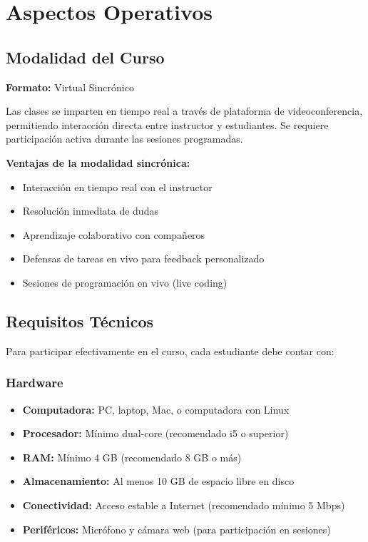 \documentclass[12pt,letterpaper]{article}
\begin{document}
\newpage

\section{Aspectos Operativos}

\subsection{Modalidad del Curso}

\textbf{Formato:} Virtual Sincrónico

Las clases se imparten en tiempo real a través de plataforma de videoconferencia, permitiendo interacción directa entre instructor y estudiantes. Se requiere participación activa durante las sesiones programadas.

\textbf{Ventajas de la modalidad sincrónica:}
\begin{itemize}[leftmargin=*]
    \item Interacción en tiempo real con el instructor
    \item Resolución inmediata de dudas
    \item Aprendizaje colaborativo con compañeros
    \item Defensas de tareas en vivo para feedback personalizado
    \item Sesiones de programación en vivo (live coding)
\end{itemize}

\subsection{Requisitos Técnicos}

Para participar efectivamente en el curso, cada estudiante debe contar con:

\subsubsection{Hardware}
\begin{itemize}[leftmargin=*]
    \item \textbf{Computadora:} PC, laptop, Mac, o computadora con Linux
    \item \textbf{Procesador:} Mínimo dual-core (recomendado i5 o superior)
    \item \textbf{RAM:} Mínimo 4 GB (recomendado 8 GB o más)
    \item \textbf{Almacenamiento:} Al menos 10 GB de espacio libre en disco
    \item \textbf{Conectividad:} Acceso estable a Internet (recomendado mínimo 5 Mbps)
    \item \textbf{Periféricos:} Micrófono y cámara web (para participación en sesiones)
\end{itemize}
\end{document}
